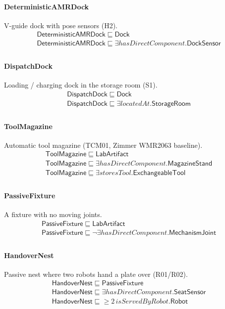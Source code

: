 \documentclass[10pt]{article}
\begin{document}
\paragraph{DeterministicAMRDock} V-guide dock with pose sensors (H2).
\[\begin{array}{l}
\mathsf{DeterministicAMRDock} \sqsubseteq  \mathsf{Dock} \\
\mathsf{DeterministicAMRDock} \sqsubseteq  \exists \mathit{hasDirectComponent}.\mathsf{DockSensor} \\
\end{array}\]
\paragraph{DispatchDock} Loading / charging dock in the storage room (S1).
\[\begin{array}{l}
\mathsf{DispatchDock} \sqsubseteq  \mathsf{Dock} \\
\mathsf{DispatchDock} \sqsubseteq  \exists \mathit{locatedAt}.\mathsf{StorageRoom} \\
\end{array}\]
\paragraph{ToolMagazine} Automatic tool magazine (TCM01, Zimmer WMR2063 baseline).
\[\begin{array}{l}
\mathsf{ToolMagazine} \sqsubseteq  \mathsf{LabArtifact} \\
\mathsf{ToolMagazine} \sqsubseteq  \exists \mathit{hasDirectComponent}.\mathsf{MagazineStand} \\
\mathsf{ToolMagazine} \sqsubseteq  \exists \mathit{storesTool}.\mathsf{ExchangeableTool} \\
\end{array}\]
\paragraph{PassiveFixture} A fixture with no moving joints.
\[\begin{array}{l}
\mathsf{PassiveFixture} \sqsubseteq  \mathsf{LabArtifact} \\
\mathsf{PassiveFixture} \sqsubseteq  \neg \exists \mathit{hasDirectComponent}.\mathsf{MechanismJoint} \\
\end{array}\]
\paragraph{HandoverNest} Passive nest where two robots hand a plate over (R01/R02).
\[\begin{array}{l}
\mathsf{HandoverNest} \sqsubseteq  \mathsf{PassiveFixture} \\
\mathsf{HandoverNest} \sqsubseteq  \exists \mathit{hasDirectComponent}.\mathsf{SeatSensor} \\
\mathsf{HandoverNest} \sqsubseteq  \geq 2\, \mathit{isServedByRobot}.\mathsf{Robot} \\
\end{array}\]
\end{document}
